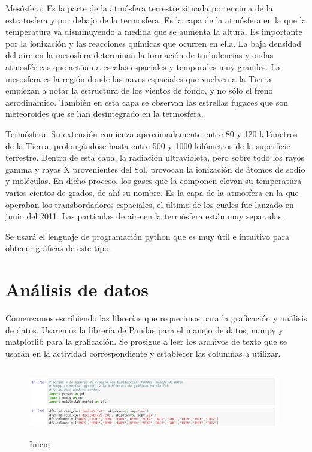 \documentclass{article}
\begin{document}
\item Mesósfera: Es la parte de la atmósfera terrestre situada por encima de la estratosfera y por debajo de la termosfera. Es la capa de la atmósfera en la que la temperatura va disminuyendo a medida que se aumenta la altura. Es importante por la ionización y las reacciones químicas que ocurren en ella. La baja densidad del aire en la mesosfera determinan la formación de turbulencias y ondas atmosféricas que actúan a escalas espaciales y temporales muy grandes. La mesosfera es la región donde las naves espaciales que vuelven a la Tierra empiezan a notar la estructura de los vientos de fondo, y no sólo el freno aerodinámico. También en esta capa se observan las estrellas fugaces que son meteoroides que se han desintegrado en la termosfera.

\item Termósfera: Su extensión comienza aproximadamente entre 80 y 120 kilómetros de la Tierra, prolongándose hasta entre 500 y 1000 kilómetros de la superficie terrestre. Dentro de esta capa, la radiación ultravioleta, pero sobre todo los rayos gamma y rayos X provenientes del Sol, provocan la ionización de átomos de sodio y moléculas. En dicho proceso, los gases que la componen elevan su temperatura varios cientos de grados, de ahí su nombre. Es la capa de la atmósfera en la que operaban los transbordadores espaciales, el último de los cuales fue lanzado en junio del 2011. Las partículas de aire en la termósfera están muy separadas.

Se usará el lenguaje de programación python que es muy útil e intuitivo para obtener gráficas de este tipo.


\section{Análisis de datos}

Comenzamos escribiendo las librerías que requerimos para la graficación y análisis de datos. Usaremos la librería de Pandas para el manejo de datos, numpy y matplotlib para la graficación.
Se prosigue a leer los archivos de texto que se usarán en la actividad correspondiente y establecer las columnas a utilizar.

\begin{figure}[h!]
  \includegraphics[width=11cm, height=3cm]{def.png}
  \caption{Inicio}
  \label{fig: rap. de vientos y ráfagas}
\end{figure}
\end{document}
